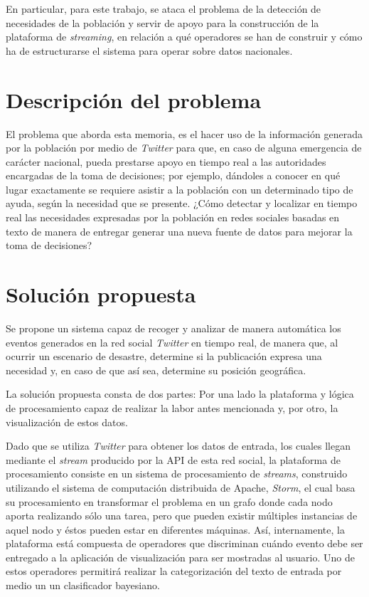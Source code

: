 En particular, para este trabajo, se ataca el problema de la detección de necesidades de la población y servir de apoyo para la construcción de la plataforma de \textit{streaming}, en relación a qué operadores se han de construir y cómo ha de estructurarse el sistema para operar sobre datos nacionales.

\section{Descripción del problema}
\label{intro:problema}

El problema que aborda esta memoria, es el hacer uso de la información generada por la población por medio de \textit{Twitter} para que, en caso de alguna emergencia de carácter nacional, pueda prestarse apoyo en tiempo real a las autoridades encargadas de la toma de decisiones; por ejemplo, dándoles a conocer en qué lugar exactamente se requiere asistir a la población con un determinado tipo de ayuda, según la necesidad que se presente. ¿Cómo detectar y localizar en tiempo real las necesidades expresadas por la población en redes sociales basadas en texto de manera de entregar generar una nueva fuente de datos para mejorar la toma de decisiones?

\section{Solución propuesta}
\label{intro:solucion}

Se propone un sistema capaz de recoger y analizar de manera automática los eventos generados en la red social \textit{Twitter} en tiempo real, de manera que, al ocurrir un escenario de desastre, determine si la publicación expresa una necesidad y, en caso de que así sea, determine su posición geográfica. 

La solución propuesta consta de dos partes: Por una lado la plataforma y lógica de procesamiento capaz de realizar la labor antes mencionada y, por otro, la visualización de estos datos.

Dado que se utiliza \textit{Twitter} para obtener los datos de entrada, los cuales llegan mediante el \textit{stream} producido por la API de esta red social, la plataforma de procesamiento consiste en un sistema de procesamiento de \textit{streams}, construido utilizando el sistema de computación distribuida de Apache, \textit{Storm}, el cual basa su procesamiento en transformar el problema en un grafo donde cada nodo aporta realizando sólo una tarea, pero que pueden existir múltiples instancias de aquel nodo y éstos pueden estar en diferentes máquinas. Así, internamente, la plataforma está compuesta de operadores que discriminan cuándo evento debe ser entregado a la aplicación de visualización para ser mostradas al usuario. Uno de estos operadores permitirá realizar la categorización del texto de entrada por medio un un clasificador bayesiano.

